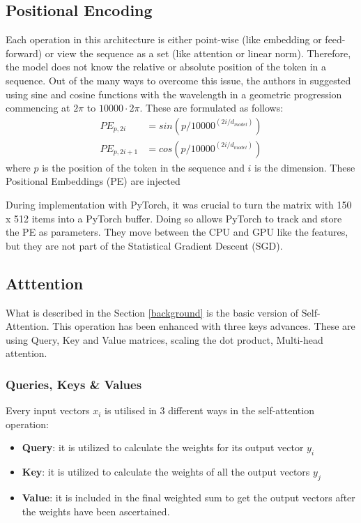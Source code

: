\documentclass[12pt,a4paper,twoside,openright]{report}
\begin{document}
\subsection{Positional Encoding}
\label{pe}
Each operation in this architecture is either point-wise (like embedding or feed-forward) or view the sequence as a set (like attention or linear norm). Therefore, the model does not know the relative or absolute position of the token in a sequence.  Out of the many ways to overcome this issue, the authors in \cite{transformers} suggested using sine and cosine functions with the wavelength in a geometric progression commencing at $2\pi$ to $10000 \cdot 2\pi$. These are formulated as follows:
\begin{align*}
    PE_{p, 2i} &= sin(p / 10000 ^ {(2i/d_{model})})\\
    PE_{p, 2i+1} &= cos(p / 10000 ^ {(2i/d_{model})})
\end{align*}
where $p$ is the position of the token in the sequence and $i$ is the dimension. These Positional Embeddings (PE) are injected

During implementation with PyTorch, it was crucial to turn the matrix with 150 x 512 items into a PyTorch buffer. Doing so allows PyTorch to track and store the PE as parameters. They move between the CPU and GPU like the features, but they are not part of the Statistical Gradient Descent (SGD).

\subsection{{Atttention}}
\label{attention}

What is described in the Section \ref{background}  is the basic version of Self-Attention. This operation has been enhanced with three keys advances. These are using Query, Key and Value matrices, scaling the dot product, Multi-head attention.

\subsubsection{Queries, Keys \& Values}

Every input vectors $x_i$ is utilised in 3 different ways in the self-attention operation:
\begin{itemize}
	\item \textbf{Query}:  it is utilized to calculate the weights for its output vector $y_i$
	\item \textbf{Key}:  it is utilized to calculate the weights of all the output vectors $y_j$
	\item \textbf{Value}:  it is included in the final weighted sum to get the output vectors after the weights have been ascertained.
\end{itemize}
\end{document}
